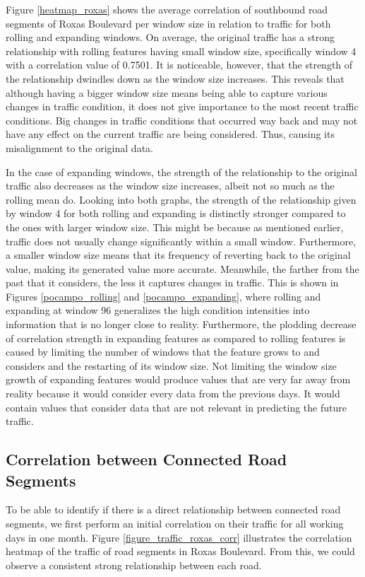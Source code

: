 Figure \ref{heatmap_roxas} shows the average correlation of southbound road segments of Roxas Boulevard per window size in relation to traffic for both rolling and expanding windows. On average, the original traffic has a strong relationship with rolling features having small window size, specifically window 4 with a correlation value of 0.7501. It is noticeable, however, that the strength of the relationship dwindles down as the window size increases. This reveals that although having a bigger window size means being able to capture various changes in traffic condition, it does not give importance to the most recent traffic conditions. Big changes in traffic conditions that occurred way back and may not have any effect on the current traffic are being considered. Thus, causing its misalignment to the original data. 

In the case of expanding windows, the strength of the relationship to the original traffic also decreases as the window size increases, albeit not so much as the rolling mean do. Looking into both graphs, the strength of the relationship given by window 4 for both rolling and expanding is distinctly stronger compared to the ones with larger window size. This might be because as mentioned earlier, traffic does not usually change significantly within a small window. Furthermore, a smaller window size means that its frequency of reverting back to the original value, making its generated value more accurate. Meanwhile, the farther from the past that it considers, the less it captures changes in traffic. This is shown in Figures \ref{pocampo_rolling} and \ref{pocampo_expanding}, where rolling and expanding at window 96 generalizes the high condition intensities into information that is no longer close to reality. Furthermore, the plodding decrease of correlation strength in expanding features as compared to rolling features is caused by limiting the number of windows that the feature grows to and considers and the restarting of its window size. Not limiting the window size growth of expanding features would produce values that are very far away from reality because it would consider every data from the previous days. It would contain values that consider data that are not relevant in predicting the future traffic.




\subsection{Correlation between Connected Road Segments}
To be able to identify if there is a direct relationship between connected road segments, we first perform an initial correlation on their traffic for all working days in one month. Figure \ref{figure_traffic_roxas_corr} illustrates the correlation heatmap of the traffic of road segments in Roxas Boulevard. From this, we could observe a consistent strong relationship between each road. 



